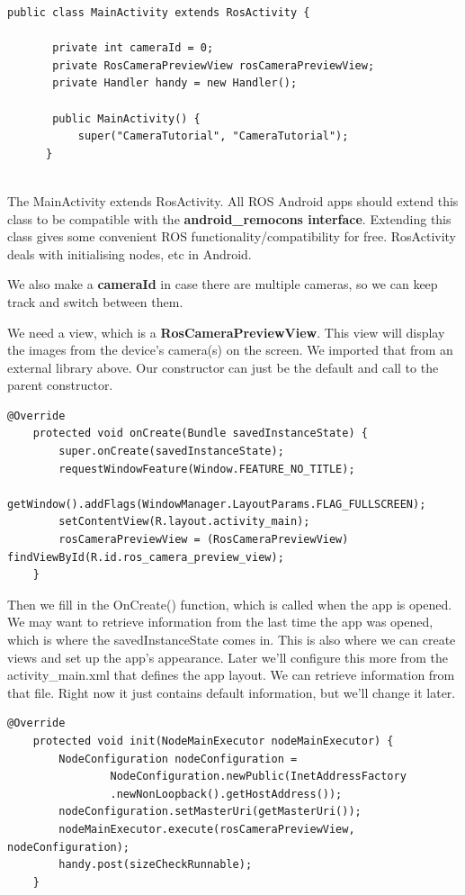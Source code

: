 \documentclass[10pt,a4paper]{article}
\begin{document}
\begin{lstlisting}[frame=single] 
public class MainActivity extends RosActivity {
    
       private int cameraId = 0;
       private RosCameraPreviewView rosCameraPreviewView;
       private Handler handy = new Handler();
    
       public MainActivity() {
           super("CameraTutorial", "CameraTutorial");
      }
   
\end{lstlisting}
   
The MainActivity extends RosActivity. All ROS Android apps should extend this class to be compatible with the \textbf{android\_remocons interface}. Extending this class gives some convenient ROS functionality/compatibility for free. RosActivity deals with initialising nodes, etc in Android.

We also make a \textbf{cameraId} in case there are multiple cameras, so we can keep track and switch between them. 

We need a view, which is a \textbf{RosCameraPreviewView}. This view will display the images from the device's camera(s) on the screen. We imported that from an external library above. Our constructor can just be the default and call to the parent constructor.

\begin{lstlisting}[frame=single] 
@Override
    protected void onCreate(Bundle savedInstanceState) {
        super.onCreate(savedInstanceState);
        requestWindowFeature(Window.FEATURE_NO_TITLE);
        getWindow().addFlags(WindowManager.LayoutParams.FLAG_FULLSCREEN);
        setContentView(R.layout.activity_main);
        rosCameraPreviewView = (RosCameraPreviewView) findViewById(R.id.ros_camera_preview_view);
    }
\end{lstlisting}

Then we fill in the OnCreate() function, which is called when the app is opened. We may want to retrieve information from the last time the app was opened, which is where the savedInstanceState comes in. This is also where we can create views and set up the app's appearance. Later we'll configure this more from the activity\_main.xml that defines the app layout. We can retrieve information from that file. Right now it just contains default information, but we'll change it later.

\begin{lstlisting}[frame=single] 
 @Override
    protected void init(NodeMainExecutor nodeMainExecutor) {
        NodeConfiguration nodeConfiguration =
                NodeConfiguration.newPublic(InetAddressFactory
                .newNonLoopback().getHostAddress());
        nodeConfiguration.setMasterUri(getMasterUri());
        nodeMainExecutor.execute(rosCameraPreviewView, nodeConfiguration);
        handy.post(sizeCheckRunnable);
    }
\end{lstlisting}
\end{document}
